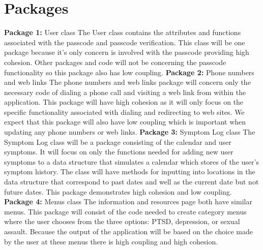 \documentclass[letterpaper,12pt,titlepage]{article}
\begin{document}
\section{Packages}
\textbf{Package 1:} User class
\noindent
\newline
\newline
The User class contains the attributes and functions associated with the passcode and passcode verification. This class will be one package because it’s only concern is involved with the passcode providing high cohesion. Other packages and code will not be concerning the passcode functionality so this package also has low coupling.
\noindent
\newline
\newline
\textbf{Package 2:} Phone numbers and web links
\noindent
\newline
\newline
The phone numbers and web links package will concern only the necessary code of dialing a phone call and visiting a web link from within the application. This package will have high cohesion as it will only focus on the specific functionality associated with dialing and redirecting to web sites. We expect that this package will also have low coupling which is important when updating any phone numbers or web links.
\noindent
\newline
\newline
\textbf{Package 3:} Symptom Log class
\noindent
\newline
\newline
The Symptom Log class will be a package consisting of the calendar and user symptoms. It will focus on only the functions needed for adding new user symptoms to a data structure that simulates a calendar which stores of the user’s symptom history. The class will have methods for inputting into locations in the data structure that correspond to past dates and well as the current date but not future dates. This package demonstrates high cohesion and low coupling.
\noindent
\newline
\newline
\textbf{Package 4:} Menus class
\noindent
\newline
\newline
The information and resources page both have similar menus. This package will consist of the code needed to create category menus where the user chooses from the three options: PTSD, depression, or sexual assault. Because the output of the application will be based on the choice made by the user at these menus there is high coupling and high cohesion.
\end{document}
